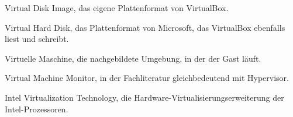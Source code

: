 \begin{glossar}
Virtual Disk Image, das eigene Plattenformat von VirtualBox.

Virtual Hard Disk, das Plattenformat von Microsoft, das VirtualBox ebenfalls liest und schreibt.

Virtuelle Maschine, die nachgebildete Umgebung, in der der Gast läuft.

Virtual Machine Monitor, in der Fachliteratur gleichbedeutend mit Hypervisor.

Intel Virtualization Technology, die Hardware-Virtualisierungserweiterung der Intel-Prozessoren.

\end{glossar}
